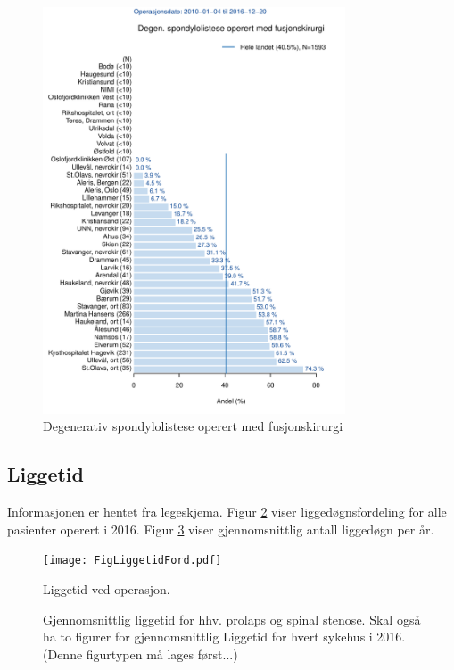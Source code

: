 \documentclass [norsk,a4paper,twoside]{article}\usepackage[]{graphicx}\usepackage[]{color}
\begin{document}
{\begin{figure}[ht]
\centering \includegraphics[width= 0.8\textwidth]{FigdegSponFusj.pdf}
\caption{\label{fig:Dura} Degenerativ spondylolistese operert med fusjonskirurgi}
\end{figure}



\subsection{Liggetid}

Informasjonen er hentet fra legeskjema.
Figur \ref{fig:Liggedogn} viser liggedøgnsfordeling for alle pasienter operert i 2016. Figur \ref{fig:LiggedognTid} viser gjennomsnittlig antall liggedøgn per år.  




\begin{figure}[h] 
\centering \texttt{[image: FigLiggetidFord.pdf]}
\caption{Liggetid ved operasjon.}
\label{fig:Liggedogn}
\end{figure}

\begin{figure}[h] 
\centerline{
}
\caption{Gjennomsnittlig liggetid for hhv. prolaps og spinal stenose. Skal også ha to figurer for gjennomsnittlig Liggetid for hvert sykehus i 2016. (Denne figurtypen må lages først...)}
\label{fig:LiggedognTid}
\end{figure}







}
\end{document}
